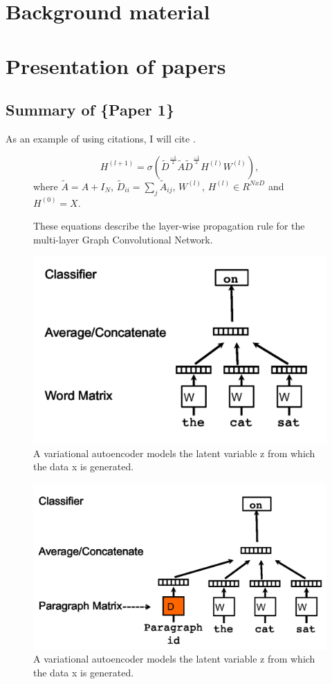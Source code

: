 \section{\label{sec:level3} Background material}


\section{\label{sec:level4} Presentation of papers}
\subsection{Summary of \{Paper 1\}}
As an example of using citations, I will cite \cite{Kipf:17}.
\begin{figure}
\centering
$$H^{(l+1)} = \sigma (\widetilde{D}^{\frac{-1}{2}}\widetilde{A}\widetilde{D}^{\frac{-1}{2}}H^{(l)}W^{(l)}),$$ where $\widetilde{A} = A + I_N$, $\widetilde{D}_{ii} = \sum_{j}\widetilde{A}_{ij}$, $W^{(l)}$, $H^{(l)} \in R^{NxD}$ and $H^{(0)} = X$. 
\caption{These equations describe the layer-wise propagation rule for the multi-layer Graph Convolutional Network.}
\label{fig:gcn}
\end{figure}

\begin{figure}
\centering
  \includegraphics[width=.5\linewidth]{files/doc2vec-1.png}
  \caption{A variational autoencoder models the latent variable z from which the data x is generated.}
  \label{fig:vae}
\end{figure}

\begin{figure}
\centering
  \includegraphics[width=.5\linewidth]{files/doc2vec-2.png}
  \caption{A variational autoencoder models the latent variable z from which the data x is generated.}
  \label{fig:vae}
\end{figure}

